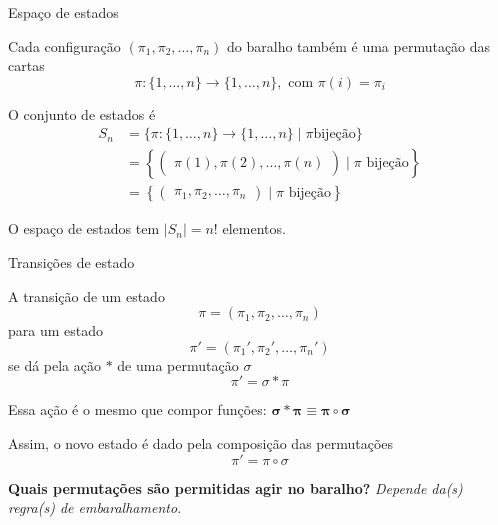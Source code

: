 \documentclass{beamer}
\begin{document}
\begin{frame}[c]{Espaço de estados}


  Cada configuração $( \pi_1,\pi_2,\dots,\pi_n)$ do baralho também é
  uma permutação das cartas
  $$\pi : \{1,\ldots,n\} \to \{1,\ldots,n\}, \text{ com }\pi(i)=\pi_i$$

  \vfill

  O conjunto de estados é
  \[
    \begin{aligned}
      S_n &= \{ \pi : \{1,\ldots,n\} \to \{1,\ldots,n\} \mid \pi \text{
        bijeção} \} \\ &= \left\{ \begin{pmatrix}
          \pi(1),\pi(2),\dots,\pi(n)
        \end{pmatrix}\mid 
        \pi \text{ bijeção} \right\}\\ &= \left\{ \begin{pmatrix}
          \pi_1,\pi_2,\dots,\pi_n
        \end{pmatrix}\mid 
        \pi \text{ bijeção} \right\}
    \end{aligned}
  \]

  \vfill

  O espaço de estados tem  $|S_n| = n!$ elementos.

\end{frame}

\begin{frame}{Transições de estado}

  A transição de um estado $$\pi = (\pi_1,\pi_2,\dots,\pi_n)$$ para um
  estado $$\pi' = (\pi_1',\pi_2',\dots,\pi_n')$$ se dá pela ação
  $\ast$ de uma permutação $\sigma$
  $$
    \pi' =\sigma   \ast  \pi
  $$
  
   
  \vfill

  Essa ação é o mesmo que compor funções:
  \(\boldsymbol{\sigma \ast \pi } \equiv  \boldsymbol{ \pi \circ \sigma} \)
  
   \vfill

   Assim, o novo estado é dado pela composição das permutações
   \[\boxed{
     \pi' = \pi \circ \sigma}
   \]
   
  \vfill

  
  \begin{block}{\textbf{Quais permutações são permitidas agir no
        baralho?}}
\hfill    \textit{ Depende da(s) regra(s) de embaralhamento.}\hfill\ 
  \end{block}
  
\end{frame}
\end{document}
